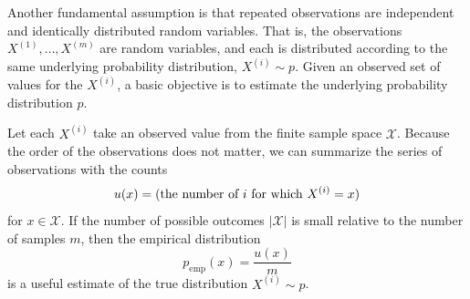 \documentclass[cclicense]{hmcthesis}
\newcommand*{\x}[1]{\ensuremath{X^{(#1)}}}
\providecommand*{\xs}{\mathcal X}
\newcommand*{\emp}{\mathrm{emp}}
\numberwithin{equation}{chapter}
\numberwithin{thmcounter}{chapter}
\begin{document}
    Another fundamental assumption is that repeated observations are independent and
    identically distributed random variables.  That is, the observations $\x 1,
    \ldots, \x m$ are random variables, and each is distributed according to the
    same underlying probability distribution, $\x i \sim p$.  Given an observed
    set of values for the $\x i$, a basic objective is to estimate the
    underlying probability distribution $p$.

    Let each $\x i$ take an observed value from the finite sample space $\xs$.
    Because the order of the observations does not matter, we can summarize the
    series of observations with the counts
    \begin{equation*}
        u(x) = \pdel{\text{the number of $i$ for which $\x i = x$}}
    \end{equation*}
    for $x \in \xs$.  If the number of possible outcomes $|\xs|$ is small
    relative to the number of samples $m$, then the empirical distribution
    \begin{equation}
        p_\emp(x) = \frac{u(x)}{m}
        \label{eq:empirical}
    \end{equation}
    is a useful estimate of the true distribution $\x i \sim p$.
\end{document}
